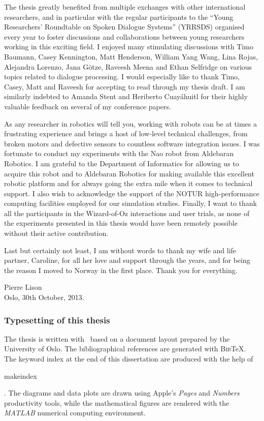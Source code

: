 The thesis greatly benefited from multiple exchanges with other international researchers, and in particular with the regular participants to the ``Young Researchers' Roundtable on Spoken Dialogue Systems'' (YRRSDS) organised every year to foster discussions and collaborations between young researchers working in this exciting field. I enjoyed many stimulating discussions with Timo Baumann, Casey Kennington, Matt Henderson, William Yang Wang, Lina Rojas, Alejandra Lorenzo, Jana G\"otze, Raveesh Meena and Ethan Selfridge on various topics related to dialogue processing.  I would especially like to thank Timo, Casey, Matt and Raveesh for accepting to read through my thesis draft. I am similarly indebted to Amanda Stent and Heriberto Cuay\'{a}huitl for their highly valuable feedback on several of my conference papers.

As any researcher in robotics will tell you, working with robots can be at times a frustrating experience and brings a host of low-level technical challenges, from broken motors and defective sensors to countless software integration issues. I was fortunate to conduct my experiments with the Nao robot from Aldebaran Robotics.  I am grateful to the Department of Informatics for allowing us to acquire this robot and to Aldebaran Robotics for making available this excellent robotic platform and for always going the extra mile when it comes to technical support. I also wish to acknowledge the support of the NOTUR high-performance computing facilities employed for our simulation studies. Finally, I want to thank all the participants in the Wizard-of-Oz interactions and user trials, as none of the experiments presented in this thesis would have been remotely possible without their active contribution.

Last but certainly not least, I am without words to thank my wife and life partner, Caroline, for all her love and support through the years, and for being the reason I moved to Norway in the first place. Thank you for everything.

\vspace{1cm}

\begin{flushright}Pierre Lison \\ Oslo, 30th October, 2013. \end{flushright}

\null 
\vfill
\begin{footnotesize}\subsubsection*{Typesetting of this thesis}
The thesis is written with \LaTeXe \ based on a document layout prepared by the University of Oslo. The bibliographical references are generated with \textsc{Bib}\negthinspace\TeX.  The keyword index at the end of this dissertation are produced with the help of \begin{scriptsize}\textsf{makeindex}\end{scriptsize}. The diagrams and data plots are drawn using Apple's \textit{Pages} and \textit{Numbers} productivity tools, while the mathematical figures are rendered with the \textit{MATLAB} numerical computing environment.\end{footnotesize}
